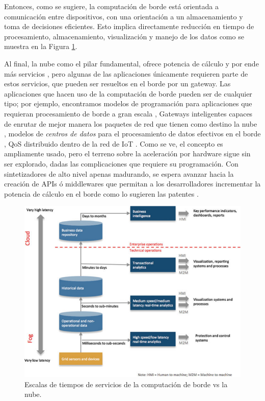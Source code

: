Entonces, como se sugiere, la computación de borde está orientada a comunicación entre dispositivos, con una orientación a un almacenamiento y toma de decisiones eficientes. Esto implica directamente reducción en tiempo de procesamiento, almacenamiento, visualización y manejo de los datos como se muestra en la Figura \ref{fig:IoTFogGr}. 

Al final, la nube como el pilar fundamental, ofrece potencia de cálculo y por ende más servicios \cite{madsen2013reliability}, pero algunas de las aplicaciones únicamente requieren parte de estos servicios, que pueden ser resueltos en el borde por un gateway. Las aplicaciones que hacen uso de la computación de borde pueden ser de cualquier tipo; por ejemplo, encontramos modelos de programación para aplicaciones que requieran procesamiento de borde a gran escala \cite{hong2013mobile}, Gateways inteligentes capaces de enrutar de mejor manera los paquetes de red que tienen como destino la nube \cite{aazam2014fog}, modelos de \textit{centros de datos} para el procesamiento de datos efectivos en el borde \cite{aazam2015fog}, QoS distribuido dentro de la red de IoT \cite{cardellini2015distributed}. Como se ve, el concepto es ampliamente usado, pero el terreno sobre la aceleración por hardware sigue sin ser explorado, dadas las complicaciones que requiere su programación. Con sintetizadores de alto nivel apenas madurando, se espera avanzar hacia la creación de APIs ó middlewares que permitan a los desarrolladores incrementar la potencia de cálculo en el borde como lo sugieren las patentes \citep{subramanian2016dynamic,zhu2013improving}.

\begin{figure}[!ht]
	\centering
		\includegraphics[scale=1.2]{Figures/IoTFogGr}
	\caption{Escalas de tiempos de servicios de la computación de borde vs la nube\cite{bonomi2014fog}.}
	\label{fig:IoTFogGr}
\end{figure}

